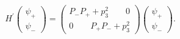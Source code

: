 \begin{equation}
\label{23}H^{\prime }\left( 
\begin{array}{c}
\psi _{+} \\ 
\psi _{-} 
\end{array}
\right) =\left( 
\begin{array}{c}
P_{-}P_{+}+p_3^2\qquad 0 \\ 
0\qquad P_{+}P_{-}+p_3^2 
\end{array}
\right) \left( 
\begin{array}{c}
\psi _{+} \\ 
\psi _{-} 
\end{array}
\right) . 
\end{equation}

